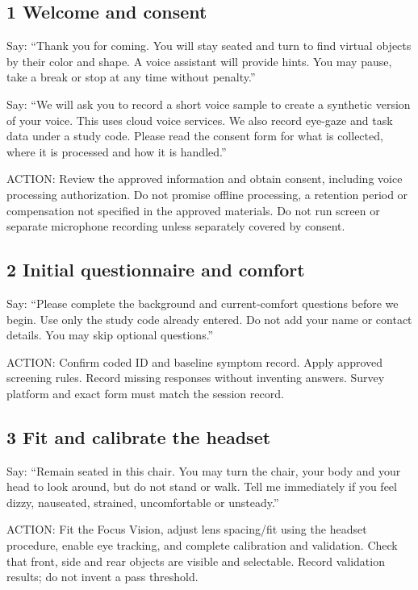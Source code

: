 \subsection{1 Welcome and consent}\label{welcome-and-consent}

Say: ``Thank you for coming. You will stay seated and turn to find
virtual objects by their color and shape. A voice assistant will provide
hints. You may pause, take a break or stop at any time without
penalty.''

Say: ``We will ask you to record a short voice sample to create a
synthetic version of your voice. This uses cloud voice services. We also
record eye-gaze and task data under a study code. Please read the
consent form for what is collected, where it is processed and how it is
handled.''

ACTION: Review the approved information and obtain consent, including
voice processing authorization. Do not promise offline processing, a
retention period or compensation not specified in the approved
materials. Do not run screen or separate microphone recording unless
separately covered by consent.

\subsection{2 Initial questionnaire and
comfort}\label{initial-questionnaire-and-comfort}

Say: ``Please complete the background and current-comfort questions
before we begin. Use only the study code already entered. Do not add
your name or contact details. You may skip optional questions.''

ACTION: Confirm coded ID and baseline symptom record. Apply approved
screening rules. Record missing responses without inventing answers.
Survey platform and exact form must match the session record.

\subsection{3 Fit and calibrate the
headset}\label{fit-and-calibrate-the-headset}

Say: ``Remain seated in this chair. You may turn the chair, your body
and your head to look around, but do not stand or walk. Tell me
immediately if you feel dizzy, nauseated, strained, uncomfortable or
unsteady.''

ACTION: Fit the Focus Vision, adjust lens spacing/fit using the headset
procedure, enable eye tracking, and complete calibration and validation.
Check that front, side and rear objects are visible and selectable.
Record validation results; do not invent a pass threshold.

